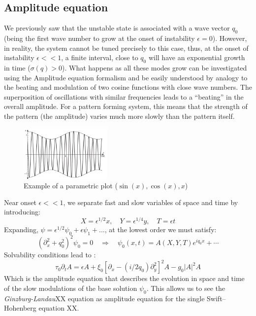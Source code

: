 \documentclass[11pt]{article}
\begin{document}
\subsection{Amplitude equation}
We previously saw that the unstable state is associated with a wave vector $q_0$ (being the first wave number to grow at the onset of instability $\epsilon=0$). However, in reality, the system cannot be tuned precisely to this case, thus, at the onset of instability $\epsilon<<1$, a finite interval, close to $q_0$ will have an exponential growth in time ($\sigma(q)>0$). What happens as all these modes grow can be investigated using the Amplitude equation formalism and be easily understood by analogy to the beating and modulation of two cosine functions with close wave numbers.
The superposition of oscillations with similar frequencies leads to a “beating” in the overall amplitude. For a pattern forming system, this means that the
strength of the pattern (the amplitude) varies much more slowly than
the pattern itself.
\begin{figure}[H]
    \centering
    \includegraphics[width=0.4\textwidth]{imgs/pfc/modulation.png}
    \caption{Example of a parametric plot ($\sin (x), \cos(x), x$)}\label{fig:modulation}
\end{figure}
Near onset $\epsilon<<1$, we separate fast and slow variables of space and time by introducing:
\begin{equation}
    X = \epsilon^{1/2} x, \quad Y = \epsilon^{1/4} y, \quad T = \epsilon t
\end{equation}
Expanding, $\psi =\epsilon^{1/2} \psi_0+\epsilon \psi_1+\dots $, at the lowest order we must satisfy:
\begin{equation}
    \left( \partial_x^2 + q_0^2 \right)^2 \psi_0 = 0 \quad \Rightarrow \quad \psi
    _0(x,t)=A(X,Y,T) e^{iq_0x}+\cdots
\end{equation}
Solvability conditions lead to :
\begin{equation}
    \tau_0\partial_t A = \epsilon A +\xi_0 \left[ \partial_x-(i/2q_0) \partial_y^2\right]^2A-g_0 |A|^2 A
\end{equation}
Which is the amplitude equation that describes the evolution in space and time of the slow modulations of the base solution $\psi_0$.  This allows us to see the \emph{Ginzburg-Landau}XX equation as amplitude equation for the single Swift–Hohenberg equation XX.
\end{document}
